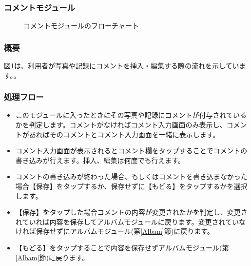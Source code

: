 \documentclass[a4j]{jarticle}
\begin{document}
\subsubsection{コメントモジュール\label{Coment}}
\begin{figure}[H]
    \begin{center}
    \caption {コメントモジュールのフローチャート}
    \label{coment}
    \end{center}
\end{figure}

\subsubsection*{概要}
図\ref{coment}は、利用者が写真や記録にコメントを挿入・編集する際の流れを示しています。。

\subsubsection*{処理フロー}
\begin{itemize}
\item このモジュールに入ったときにその写真や記録にコメントが付与されているかを判定します。コメントがなければコメント入力画面のみ表示し、コメントがあればそのコメントとコメント入力画面を一緒に表示します。
\item コメント入力画面が表示されるとコメント欄をタップすることでコメントの書き込みが行えます。挿入、編集は何度でも行えます。
\item コメントの書き込みが終わった場合、もしくはコメントを書き込まなかった場合【保存】をタップするか、保存せずに【もどる】をタップするかを選択します。
\item 【保存】をタップした場合コメントの内容が変更されたかを判定し、変更されていれば内容を保存してアルバムモジュールに戻ります。変更されていなければ保存せずにアルバムモジュール(第\ref{Albam}節)に戻ります。
\item 【もどる】をタップすることで内容を保存せずアルバムモジュール(第\ref{Albam}節)に戻ります。
\end{itemize}
\newpage
\end{document}
